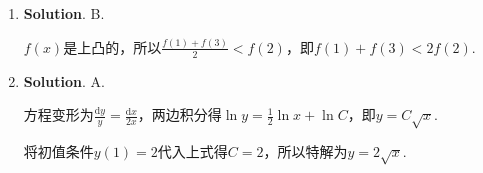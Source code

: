 \documentclass[../Main.tex]{subfiles}
\begin{document}
\begin{enumerate}
          当$x\to-\infty$时，$\lim_{x\to-\infty}\frac{\frac{1}{x}+\ln\left(1+\mathrm{e}^{x}\right)}{x}
              =0$，$\lim_{x\to-\infty}\left[\frac{1}{x}+\ln\left(1+\mathrm{e}^{x}\right)\right
              ]=0$，

          所以曲线$y=\frac{1}{x}+\ln\left(1+\mathrm{e}^{x}\right)$有水平渐近线$y=0$.

          故曲线$y=\frac{1}{x}+\ln\left(1+\mathrm{e}^{x}\right)$的渐近线条数为3.

    \item \textbf{Solution}. B.

          $f(x)$是上凸的，所以$\frac{f(1)+f(3)}{2}<f(2)$，即$f(1)+f(3)<2f(2)$.

    \item \textbf{Solution}. A.

          方程变形为$\frac{\mathrm{d}y}{y}=\frac{\mathrm{d}x}{2x}$，两边积分得$\ln y=
              \frac{1}{2}\ln x+\ln C$，即$y=C\sqrt{x}$.

          将初值条件$y(1)=2$代入上式得$C=2$，所以特解为$y=2\sqrt{x}$.
\end{enumerate}
\end{document}

